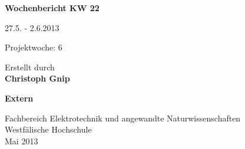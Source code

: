 
\begin{center}
{\Huge \textbf{Wochenbericht KW 22}\par}
\vspace{1cm}
{\Huge 27.5. - 2.6.2013\par}
\vspace{1cm}
{\Huge Projektwoche: 6\par}

\vspace{2cm}

\large{Erstellt durch}\\
\Large{\textbf{Christoph Gnip}}


\vspace{4cm}

\Large{\textbf{Extern}}

\vfill

{\normalsize Fachbereich Elektrotechnik und angewandte Naturwissenschaften\\
Westfälische Hochschule\\[2ex]Mai 2013}


\end{center}
\newpage